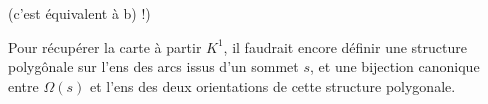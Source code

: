 (c'est  équivalent à b) !)

Pour  récupérer la carte à partir  $K^1$, il
faudrait encore définir une structure polygônale
sur l'ens des arcs issus d'un sommet $s$,
et une bijection canonique entre $\Omega(s)$ et
l'ens des deux orientations de cette structure
polygonale.
